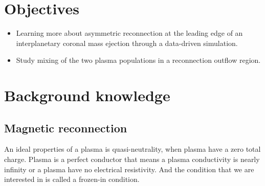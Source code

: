 \documentclass[12pt, a4paper]{article}
\begin{document}

\section{Objectives} 
\begin{itemize}
\item Learning more about asymmetric reconnection at the leading edge of an interplanetary coronal mass ejection through a data-driven simulation.
\item Study mixing of the two plasma populations in a reconnection outflow region.
\end{itemize}

 
\section{Background knowledge}
	\subsection*{Magnetic reconnection}
		An ideal properties of a plasma is quasi-neutrality, when plasma have a zero total charge. Plasma is a perfect conductor that means a plasma conductivity is nearly infinity or a plasma have no electrical resistivity. And the condition that we are interested in is called a frozen-in condition.
\end{document}
